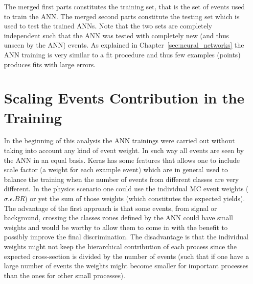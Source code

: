 The merged first parts constitutes the training set, that is the set of events used to train the ANN. The merged second parts constitute the testing set which is used to test the trained ANNs. Note that the two sets are completely independent such that the ANN was tested with completely new (and thus unseen by the ANN) events. As explained in Chapter~\ref{sec:neural_networks} the ANN training is very similar to a fit procedure and thus few examples (points) produces fits with large errors.

\section{Scaling Events Contribution in the Training}
\label{subsec:scale_train}
In the beginning of this analysis the ANN trainings were carried out without taking into account any kind of event weight. In such way all events are seen by the ANN in an equal basis. Keras has some features that allows one to include scale factor (a weight for each example event) which are in general used to balance the training when the number of events from different classes are very different. In the physics scenario one could use the individual MC event weights ($\sigma.\epsilon.BR$) or yet the sum of those weights (which constitutes the expected yields). The advantage of the first approach is that some events, from signal or background, crossing the classes zones defined by the ANN could have small weights and would be worthy to allow them to come in with the benefit to possibly improve  the final discrimination. The disadvantage is that the individual weights might not keep the hierarchical contribution of each process since the expected cross-section is divided by the number of events (such that if one have a large number of events the weights might become smaller for important processes than the ones for other small processes).

